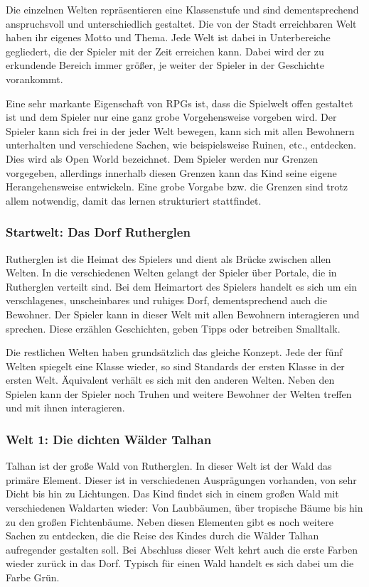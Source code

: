 Die einzelnen Welten repräsentieren eine Klassenstufe und sind dementsprechend anspruchsvoll und unterschiedlich gestaltet. Die von der Stadt erreichbaren Welt haben ihr eigenes Motto und Thema. Jede Welt ist dabei in Unterbereiche gegliedert, die der Spieler mit der Zeit erreichen kann. Dabei wird der zu erkundende Bereich immer größer, je weiter der Spieler in der Geschichte vorankommt. 

Eine sehr markante Eigenschaft von RPGs ist, dass die Spielwelt offen gestaltet ist und dem Spieler nur eine ganz grobe Vorgehensweise vorgeben wird. Der Spieler kann sich frei in der jeder Welt bewegen, kann sich mit allen Bewohnern unterhalten und verschiedene Sachen, wie beispielsweise Ruinen, etc., entdecken. Dies wird als Open World bezeichnet. Dem Spieler werden nur Grenzen vorgegeben, allerdings innerhalb diesen Grenzen kann das Kind seine eigene Herangehensweise entwickeln. Eine grobe Vorgabe bzw. die Grenzen sind trotz allem notwendig, damit das lernen strukturiert stattfindet.

\subsubsection{Startwelt: Das Dorf Rutherglen}
	Rutherglen ist die Heimat des Spielers und dient als Brücke zwischen allen Welten. In die verschiedenen Welten gelangt der Spieler über Portale, die in Rutherglen verteilt sind. Bei dem Heimartort des Spielers handelt es sich um ein verschlagenes, unscheinbares und ruhiges Dorf, dementsprechend auch die Bewohner. Der Spieler kann in dieser Welt mit allen Bewohnern interagieren und sprechen. Diese erzählen Geschichten, geben Tipps oder betreiben Smalltalk.
	
	Die restlichen Welten haben grundsätzlich das gleiche Konzept. Jede der fünf Welten spiegelt eine Klasse wieder, so sind Standards der ersten Klasse in der ersten Welt. Äquivalent verhält es sich mit den anderen Welten. Neben den Spielen kann der Spieler noch Truhen und weitere Bewohner der Welten treffen und mit ihnen interagieren.
	
\subsubsection{Welt 1: Die dichten Wälder Talhan}
	Talhan ist der große Wald von Rutherglen. In dieser Welt ist der Wald das primäre Element. Dieser ist in verschiedenen Ausprägungen vorhanden, von sehr Dicht bis hin zu Lichtungen. Das Kind findet sich in einem großen Wald mit verschiedenen Waldarten wieder: Von Laubbäumen, über tropische Bäume bis hin zu den großen Fichtenbäume. Neben diesen Elementen gibt es noch weitere Sachen zu entdecken, die die Reise des Kindes durch die Wälder Talhan aufregender gestalten soll. Bei Abschluss dieser Welt kehrt auch die erste Farben wieder zurück in das Dorf. Typisch für einen Wald handelt es sich dabei um die Farbe Grün.
	

